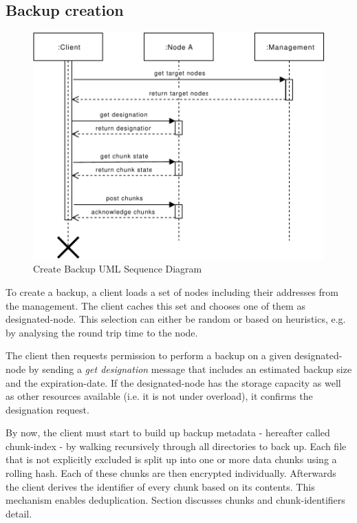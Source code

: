 \subsection{Backup creation}
\begin{figure}[h]
    \centering
    \includegraphics[width=\linewidth]{resources/create_backup}
    \caption{Create Backup UML Sequence Diagram}
\end{figure}

To create a backup, a \gls{client} loads a set of \glspl{node} including their addresses from the \gls{management}. The \gls{client} caches this set and chooses one of them as \gls{designated-node}. This selection can either be random or based on heuristics, e.g. by analysing the round trip time to the \gls{node}.

The \gls{client} then requests permission to perform a backup on a given \gls{designated-node} by sending a \emph{get designation} message that includes an estimated backup size and the \gls{expiration-date}. If the \gls{designated-node} has the storage capacity as well as other resources available (i.e. it is not under overload), it confirms the designation request.

By now, the \gls{client} must start to build up backup metadata - hereafter called \gls{chunk-index} - by walking recursively through all directories to back up. Each file that is not explicitly excluded is split up into one or more data \glspl{chunk} using a rolling hash\cite{borg-data-structures}. Each of these \glspl{chunk} are then encrypted individually. Afterwards the \gls{client} derives the identifier of every \gls{chunk} based on its contents. This mechanism enables deduplication. Section  discusses \glspl{chunk} and \glspl{chunk-identifier} detail.

